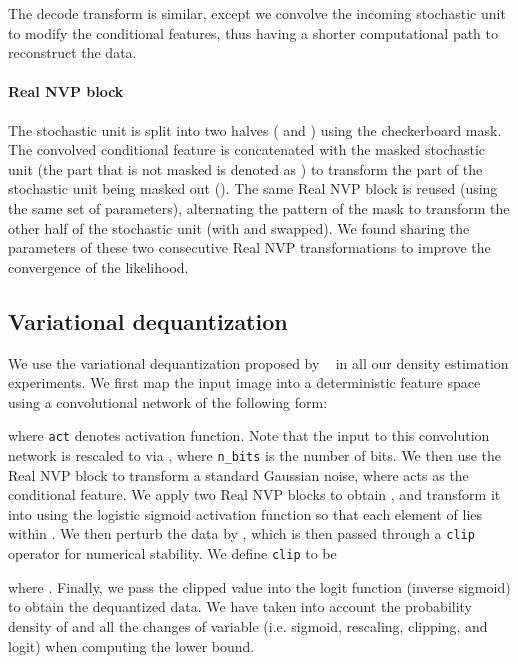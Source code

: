 \documentclass{article}
\begin{document}
The decode transform is similar, except we convolve the incoming stochastic unit to modify the conditional features, thus having a shorter computational path to reconstruct the data. 



\paragraph{Real NVP block}
The stochastic unit is split into two halves ( and ) using the checkerboard mask. 
The convolved conditional feature is concatenated with the masked stochastic unit (the part that is not masked is denoted as ) to transform the part of the stochastic unit being masked out (). 
The same Real NVP block is reused (using the same set of parameters), alternating the pattern of the mask to transform the other half of the stochastic unit (with  and  swapped). 
We found sharing the parameters of these two consecutive Real NVP transformations to improve the convergence of the likelihood. 


\subsection{Variational dequantization}
We use the variational dequantization proposed by ~\citet{ho2019flow++} in all our density estimation experiments. 
We first map the input image  into a deterministic feature  space using a convolutional network of the following form: 

where \texttt{act} denotes activation function. 
Note that the input to this convolution network is rescaled to  via , where \texttt{n\_bits} is the number of bits.
We then use the Real NVP block to transform a standard Gaussian noise, where  acts as the conditional feature. 
We apply two Real NVP blocks to obtain , and transform it into  using the logistic sigmoid activation function so that each element of  lies within .
We then perturb the data by , which is then passed through a \texttt{clip} operator for numerical stability. 
We define \texttt{clip} to be 

where . 
Finally, we pass the clipped value into the logit function (inverse sigmoid) to obtain the dequantized data. 
We have taken into account the probability density of  and all the changes of variable (i.e. sigmoid, rescaling, clipping, and logit) when computing the lower bound.
\end{document}
